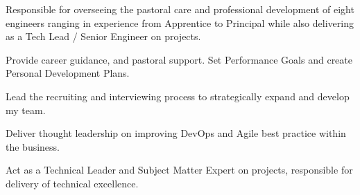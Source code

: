 \sectionsep{}
Responsible for overseeing the pastoral care and professional development of eight engineers ranging in experience from Apprentice to Principal while also delivering as a Tech Lead / Senior Engineer on projects.
\vspace{0.25em}
\begin{tightemize}
  \item Provide career guidance, and pastoral support. Set Performance Goals and create Personal Development Plans.
  \item Lead the recruiting and interviewing process to strategically expand and develop my team.
  \item Deliver thought leadership on improving DevOps and Agile best practice within the business.
  \item Act as a Technical Leader and Subject Matter Expert on projects, responsible for delivery of technical excellence.
\end{tightemize}
\sectionsep{}
